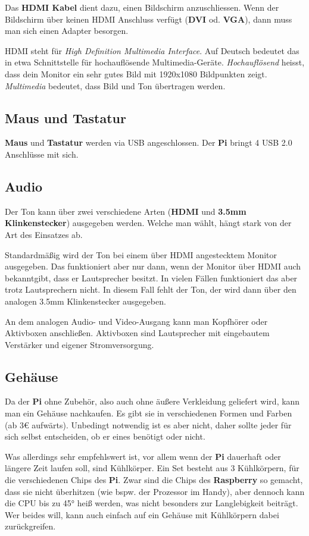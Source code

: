\documentclass[12pt,a4paper]{article}
\begin{document}
Das \textbf{HDMI Kabel} dient dazu, einen Bildschirm anzuschliessen. Wenn der Bildschirm über keinen HDMI Anschluss verfügt (\textbf{DVI} od. \textbf{VGA}), dann muss man sich einen Adapter besorgen.

HDMI steht für \textit{High Definition Multimedia Interface}. Auf Deutsch bedeutet das in etwa Schnittstelle für hochauflösende Multimedia-Geräte. \textit{Hochauflösend} heisst, dass dein Monitor ein sehr gutes Bild mit 1920x1080 Bildpunkten zeigt. \textit{Multimedia} bedeutet, dass Bild und Ton übertragen werden.

\subsection{Maus und Tastatur}

\textbf{Maus} und \textbf{Tastatur} werden via USB angeschlossen. Der \textbf{Pi} bringt 4 USB 2.0 Anschlüsse mit sich.

\subsection{Audio}

Der Ton kann über zwei verschiedene Arten (\textbf{HDMI} und \textbf{3.5mm Klinkenstecker}) ausgegeben werden. Welche man wählt, hängt stark von der Art des Einsatzes ab.

Standardmäßig wird der Ton bei einem über HDMI angestecktem Monitor ausgegeben. Das funktioniert aber nur dann, wenn der Monitor über HDMI auch bekanntgibt, dass er Lautsprecher besitzt. In vielen Fällen funktioniert das aber trotz Lautsprechern nicht. In diesem Fall fehlt der Ton, der wird dann über den analogen 3.5mm Klinkenstecker ausgegeben.

An dem analogen Audio- und Video-Ausgang kann man Kopfhörer oder Aktivboxen anschließen. Aktivboxen sind Lautsprecher mit eingebautem Verstärker und eigener Stromversorgung.

\subsection{Gehäuse}

Da der \textbf{Pi} ohne Zubehör, also auch ohne äußere Verkleidung geliefert wird, kann man ein Gehäuse nachkaufen. Es gibt sie in verschiedenen Formen und Farben (ab 3€ aufwärts). Unbedingt notwendig ist es aber nicht, daher sollte jeder für sich selbst entscheiden, ob er eines benötigt oder nicht.

Was allerdings sehr empfehlswert ist, vor allem wenn der \textbf{Pi} dauerhaft oder längere Zeit laufen soll, sind Kühlkörper. Ein Set besteht aus 3 Kühlkörpern, für die verschiedenen Chips des \textbf{Pi}. Zwar sind die Chips des \textbf{Raspberry} so gemacht, dass sie nicht überhitzen (wie bspw. der Prozessor im Handy), aber dennoch kann die CPU bis zu 45° heiß werden, was nicht besonders zur Langlebigkeit beiträgt. Wer beides will, kann auch einfach auf ein Gehäuse mit Kühlkörpern dabei zurückgreifen.
\end{document}
